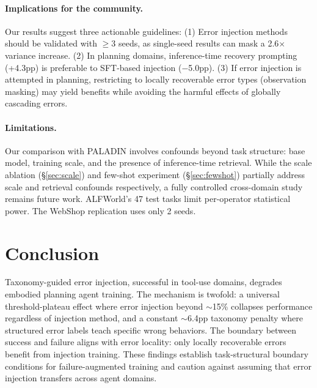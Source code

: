 \documentclass[11pt,a4paper]{article}
\begin{document}
\paragraph{Implications for the community.}

Our results suggest three actionable guidelines: (1) Error injection methods should be validated with $\geq$3 seeds, as single-seed results can mask a 2.6$\times$ variance increase. (2) In planning domains, inference-time recovery prompting (+4.3pp) is preferable to SFT-based injection ($-$5.0pp). (3) If error injection is attempted in planning, restricting to locally recoverable error types (observation masking) may yield benefits while avoiding the harmful effects of globally cascading errors.

\paragraph{Limitations.}

Our comparison with PALADIN involves confounds beyond task structure: base model, training scale, and the presence of inference-time retrieval. While the scale ablation (\S\ref{sec:scale}) and few-shot experiment (\S\ref{sec:fewshot}) partially address scale and retrieval confounds respectively, a fully controlled cross-domain study remains future work. ALFWorld's 47 test tasks limit per-operator statistical power. The WebShop replication uses only 2 seeds.

\section{Conclusion}

Taxonomy-guided error injection, successful in tool-use domains, degrades embodied planning agent training. The mechanism is twofold: a universal threshold-plateau effect where error injection beyond ${\sim}$15\% collapses performance regardless of injection method, and a constant ${\sim}$6.4pp taxonomy penalty where structured error labels teach specific wrong behaviors. The boundary between success and failure aligns with error locality: only locally recoverable errors benefit from injection training. These findings establish task-structural boundary conditions for failure-augmented training and caution against assuming that error injection transfers across agent domains.
\end{document}
